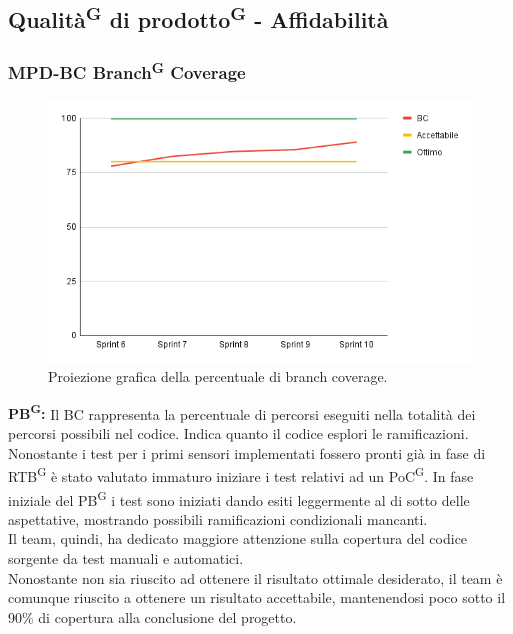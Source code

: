 \documentclass[8pt]{article}
\newcommand{\glossterm}[1]{#1\textsuperscript{G}} %
\begin{document}
\subsection{\glossterm{Qualità} di \glossterm{prodotto} - Affidabilità}
\subsubsection{MPD-BC \glossterm{Branch} Coverage}
\begin{figure}[h!]
    \centering
    \includegraphics[width=1\textwidth]{images_pdq/BC.png}
    \caption{Proiezione grafica della percentuale di branch coverage.}
    \label{fig:Proiezione grafica della percentuale di branch coverage}
\end{figure}
\textbf{\glossterm{PB}:} Il BC rappresenta la percentuale di percorsi eseguiti nella totalità dei percorsi possibili nel codice. Indica quanto il codice esplori le ramificazioni. Nonostante i test per i primi sensori implementati fossero pronti già in fase di \glossterm{RTB} è stato valutato immaturo iniziare i test relativi ad un \glossterm{PoC}. In fase iniziale del \glossterm{PB} i test sono iniziati dando esiti leggermente al di sotto delle aspettative, mostrando possibili ramificazioni condizionali mancanti. \\ Il team, quindi, ha dedicato maggiore attenzione sulla copertura del codice sorgente da test manuali e automatici. \\ Nonostante non sia riuscito ad ottenere il risultato ottimale desiderato, il team è comunque riuscito a ottenere un risultato accettabile, mantenendosi poco sotto il 90\% di copertura alla conclusione del progetto.
\clearpage
\end{document}
